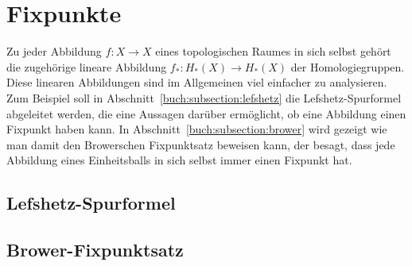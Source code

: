 %
%
%
\section{Fixpunkte
\label{buch:section:fixpunkte}}
Zu jeder Abbildung $f\colon X\to X$ eines topologischen Raumes in sich
selbst gehört die zugehörige lineare Abbildung $f_*\colon H_*(X)\to H_*(X)$
der Homologiegruppen.
Diese linearen Abbildungen sind im Allgemeinen viel einfacher zu
analysieren.
Zum Beispiel soll in Abschnitt~\ref{buch:subsection:lefshetz}
die Lefshetz-Spurformel abgeleitet werden, die eine Aussagen darüber
ermöglicht, ob eine Abbildung einen Fixpunkt haben kann.
In Abschnitt~\ref{buch:subsection:brower} wird gezeigt wie man damit 
den Browerschen Fixpunktsatz beweisen kann, der besagt, dass jede
Abbildung eines Einheitsballs in sich selbst immer einen Fixpunkt hat.

\subsection{Lefshetz-Spurformel
\label{buch:subsection:lefshetz}}

\subsection{Brower-Fixpunktsatz
\label{buch:subsection:brower}}
